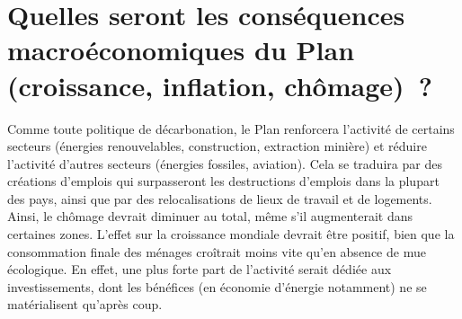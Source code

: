 \documentclass[a5paper,french,openany]{memoir}
\begin{document}
\section*{\normalsize Quelles seront les conséquences macroéconomiques du Plan (croissance, inflation, chômage)~?}\label{q:macro}

Comme toute politique de décarbonation, le Plan renforcera l'activité de certains secteurs (énergies renouvelables, construction, extraction minière) et réduire l'activité d'autres secteurs (énergies fossiles, aviation). Cela se traduira par des créations d'emplois qui surpasseront les destructions d'emplois dans la plupart des pays, ainsi que par des relocalisations de lieux de travail et de logements. Ainsi, le chômage devrait diminuer au total, même s'il augmenterait dans certaines zones. L'effet sur la croissance mondiale devrait être positif, bien que la consommation finale des ménages croîtrait moins vite qu'en absence de mue écologique. En effet, une plus forte part de l'activité serait dédiée aux investissements, dont les bénéfices (en économie d'énergie notamment) ne se matérialisent qu'après coup. 
\end{document}
